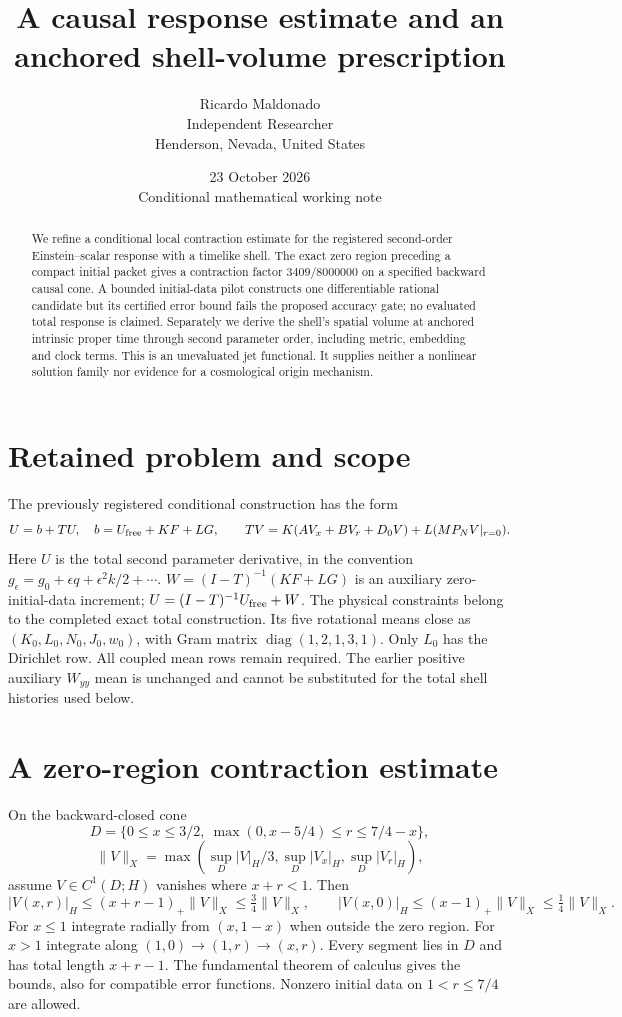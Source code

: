 \documentclass[11pt]{article}
\title{A causal response estimate and an anchored shell-volume prescription}
\author{Ricardo Maldonado\\Independent Researcher\\Henderson, Nevada, United States}
\date{23 October 2026\\Conditional mathematical working note}
\begin{document}
\maketitle
\begin{abstract}
We refine a conditional local contraction estimate for the registered second-order Einstein--scalar response with a timelike shell. The exact zero region preceding a compact initial packet gives a contraction factor $3409/8000000$ on a specified backward causal cone. A bounded initial-data pilot constructs one differentiable rational candidate but its certified error bound fails the proposed accuracy gate; no evaluated total response is claimed. Separately we derive the shell's spatial volume at anchored intrinsic proper time through second parameter order, including metric, embedding and clock terms. This is an unevaluated jet functional. It supplies neither a nonlinear solution family nor evidence for a cosmological origin mechanism.
\end{abstract}

\section*{Retained problem and scope}
The previously registered conditional construction has the form
\[
 U=b+TU,\quad b=U_{\rm free}+KF+LG,\qquad
 TV=K(AV_x+BV_r+D_0V)+L(MP_NV|_{r=0}).
\]
Here $U$ is the total second parameter derivative, in the convention
$g_\epsilon=g_0+\epsilon q+\epsilon^2 k/2+\cdots$.
$W=(I-T)^{-1}(KF+LG)$ is an auxiliary zero-initial-data increment;
$U=(I-T)^{-1}U_{\rm free}+W$. The physical constraints belong to the
completed exact total construction. Its five rotational means close as
$(K_0,L_0,N_0,J_0,w_0)$, with Gram matrix $\operatorname{diag}(1,2,1,3,1)$.
Only $L_0$ has the Dirichlet row. All coupled mean rows remain required.
The earlier positive auxiliary $W_{yy}$ mean is unchanged and cannot be
substituted for the total shell histories used below.

\section*{A zero-region contraction estimate}
On the backward-closed cone
\[
 D=\{0\le x\le3/2,\ \max(0,x-5/4)\le r\le7/4-x\},
\]
\[
 \|V\|_X=\max(\sup_D|V|_H/3,\sup_D|V_x|_H,\sup_D|V_r|_H),
\]
assume $V\in C^1(D;H)$ vanishes where $x+r<1$. Then
\[
 |V(x,r)|_H\le(x+r-1)_+\|V\|_X\le\tfrac34\|V\|_X,
 \qquad |V(x,0)|_H\le(x-1)_+\|V\|_X\le\tfrac14\|V\|_X.
\]
For $x\le1$ integrate radially from $(x,1-x)$ when outside the zero
region. For $x>1$ integrate along $(1,0)\to(1,r)\to(x,r)$.
Every segment lies in $D$ and has total length $x+r-1$.
The fundamental theorem of calculus gives the bounds, also for compatible
error functions. Nonzero initial data on $1<r\le7/4$ are allowed.
\end{document}
